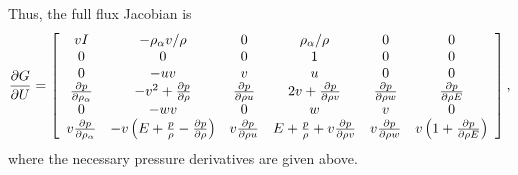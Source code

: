 Thus, the full flux Jacobian is
%
\begin{equation*}
\frac{\partial G}{\partial U} = \left[ \begin{array}{cccccc}
v I & -\rho_{\alpha} v / \rho & 0 & \rho_{\alpha} / \rho & 0 & 0 \\
0 & 0 & 0 & 1 & 0 & 0 \\
0 & -uv & v & u & 0 & 0 \\
\frac{\partial p}{\partial \rho_{\alpha}} & -v^2 +  \frac{\partial p}{\partial \rho} & \frac{\partial p}{\partial \rho u} & 2v + \frac{\partial p}{\partial \rho v} & \frac{\partial p}{\partial \rho w} & \frac{\partial p}{\partial \rho E} \\
0 & -wv & 0 & w & v & 0 \\
v \frac{\partial p}{\partial \rho_{\alpha}} & -v \left(E + \frac{p}{\rho} - \frac{\partial p}{\partial \rho}\right) & v \frac{\partial p}{\partial \rho u} & E + \frac{p}{\rho} + v \frac{\partial p}{\partial \rho v}  & v \frac{\partial p}{\partial \rho w} & v \left( 1+ \frac{\partial p}{\partial \rho E} \right)
\end{array} \right],
\end{equation*}
%
where the necessary pressure derivatives are given above.


